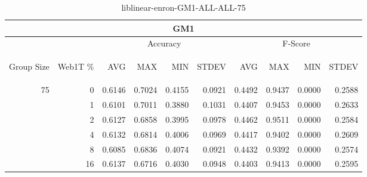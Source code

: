 \begin{center}
\begin{table}[htbp]
\begin{tabular}{ | r | r | r | r | r | r | r | r | r | r |}
\hline
\multicolumn{10}{|c|}{GM1}\\
\hline
 & & \multicolumn{4}{|c|}{Accuracy} & \multicolumn{4}{|c|}{F-Score}\\ \cline{3-10}
\begin{sideways}Group Size\end{sideways} & \begin{sideways}Web1T \%\end{sideways} & \begin{sideways}AVG\end{sideways} & \begin{sideways}MAX\end{sideways} & \begin{sideways}MIN\end{sideways} & \begin{sideways}STDEV\end{sideways} & \begin{sideways}AVG\end{sideways} & \begin{sideways}MAX\end{sideways} & \begin{sideways}MIN\end{sideways} & \begin{sideways}STDEV\end{sideways}\\
\hline
\multirow{6}{*}{75}
 & 0 & 0.6146 & 0.7024 & 0.4155 & 0.0921 & 0.4492 & 0.9437 & 0.0000 & 0.2588\\ \cline{2-10}
 & 1 & 0.6101 & 0.7011 & 0.3880 & 0.1031 & 0.4407 & 0.9453 & 0.0000 & 0.2633\\ \cline{2-10}
 & 2 & 0.6127 & 0.6858 & 0.3995 & 0.0978 & 0.4462 & 0.9511 & 0.0000 & 0.2584\\ \cline{2-10}
 & 4 & 0.6132 & 0.6814 & 0.4006 & 0.0969 & 0.4417 & 0.9402 & 0.0000 & 0.2609\\ \cline{2-10}
 & 8 & 0.6085 & 0.6836 & 0.4074 & 0.0921 & 0.4432 & 0.9392 & 0.0000 & 0.2574\\ \cline{2-10}
 & 16 & 0.6137 & 0.6716 & 0.4030 & 0.0948 & 0.4403 & 0.9413 & 0.0000 & 0.2595\\ \cline{2-10}
\hline
\end{tabular}
\caption{liblinear-enron-GM1-ALL-ALL-75}
\end{table}
\end{center}

